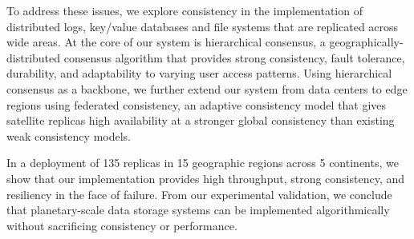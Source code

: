 To address these issues, we explore consistency in the implementation of distributed logs, key/value databases and file systems that are replicated across wide areas. At the core of our system is hierarchical consensus, a geographically-distributed consensus algorithm that provides strong consistency, fault tolerance, durability, and adaptability to varying user access patterns. Using hierarchical consensus as a backbone, we further extend our system from data centers to edge regions using federated consistency, an adaptive consistency model that gives satellite replicas high availability at a stronger global consistency than existing weak consistency models.

In a deployment of 135 replicas in 15 geographic regions across 5 continents, we show that our implementation provides high throughput, strong consistency, and resiliency in the face of failure. From our experimental validation, we conclude that planetary-scale data storage systems can be implemented algorithmically without sacrificing consistency or performance. 

